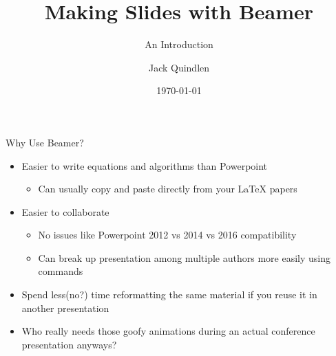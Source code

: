 \documentclass[11pt,mathserif]{beamer} %
\title[Beamer Slides]{Making Slides with Beamer} %
\subtitle[]{An Introduction} %
\author[J. Quindlen]{Jack Quindlen \inst{1}} %
\institute[ACL,MIT]	{\inst{1} Aerospace Controls Laboratory, MIT } %
\date{\today} %
\begin{document}

\frame{\titlepage} %

\begin{frame}[fragile,t]{Why Use Beamer?} %
	\begin{itemize} %
		\item Easier to write equations and algorithms than Powerpoint %
		\begin{itemize} %
			\item Can usually copy and paste directly from your LaTeX papers %
		\end{itemize} %
\vspace{0.2in} %
		\item Easier to collaborate %
		\begin{itemize} %
			\item No issues like Powerpoint 2012 vs 2014 vs 2016 compatibility
			\item Can break up presentation among multiple authors more easily using \verb|| commands
		\end{itemize}
\vspace{0.2in}
		\item Spend less(no?) time reformatting the same material if you reuse it in another presentation 
\vspace{0.2in}
		\item Who really needs those goofy animations during an actual conference presentation anyways?
	\end{itemize}
\end{frame}
\end{document}
